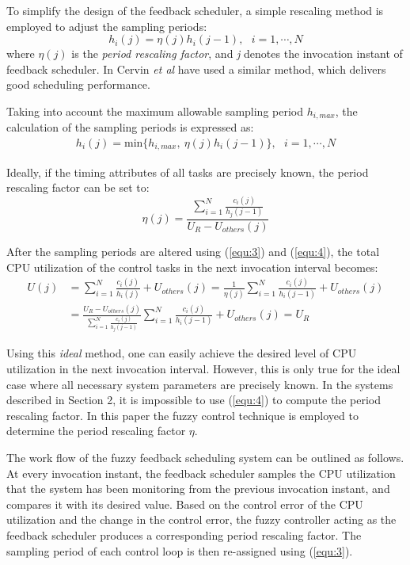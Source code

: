 \documentclass[12pt,a4paper]{ijicic}
\begin{document}
To simplify the design of the feedback scheduler, a simple
rescaling method is employed to adjust the sampling periods:
\begin{equation}
\label{equ:2}
h_i(j)=\eta(j)h_i(j-1),\ \ \ i=1,\cdots,N
\end{equation}
where $\eta(j)$  is the \emph{period rescaling factor}, and \emph{j}
denotes the invocation instant of feedback scheduler. In \cite{R6} Cervin
\emph{et al} have used a similar method, which delivers good scheduling performance.

Taking into account the maximum allowable sampling period
$h_{i,max}$, the calculation of the sampling periods is expressed as:
\begin{equation} \label{equ:3}
\begin{split}
h_i(j)=\mbox{min}\{h_{i,max},\ \eta(j)h_i(j-1)\},\ \ \ i=1,\cdots,N
\end{split}
\end{equation}

Ideally, if the timing attributes of all tasks are precisely known,
the period rescaling factor can be set to:
\begin{equation}
\label{equ:4}
\eta(j)=\frac{\sum^N_{i=1}\frac{c_i(j)}{h_j(j-1)}}{U_R-U_{others}(j)}
\end{equation}

After the sampling periods are altered using (\ref{equ:3}) and
(\ref{equ:4}), the total CPU utilization of the control tasks in the
next invocation interval becomes:
\begin{equation} \label{eq:5}
\begin{split}
U(j)&=\sum^N_{i=1}\frac{c_i(j)}{h_i(j)}+U_{others}(j)
=\frac{1}{\eta(j)}\sum^N_{i=1}\frac{c_i(j)}{h_i(j-1)}+U_{others}(j)\\
&=\frac{U_R-U_{others}(j)}{\sum^N_{i=1}\frac{c_i(j)}{h_j(j-1)}}\sum^N_{i=1}\frac{c_i(j)}{h_i(j-1)}
+U_{others}(j)=U_R
\end{split}
\end{equation}

Using this \emph{ideal} method, one can easily achieve the desired
level of CPU utilization in the next invocation interval. However,
this is only true for the ideal case where all necessary system
parameters are precisely known. In the systems described in Section
2, it is impossible to use (\ref{equ:4}) to compute the period
rescaling factor. In this paper the fuzzy control technique is
employed to determine the period rescaling factor $\eta$.

The work flow of the fuzzy feedback scheduling system can be
outlined as follows. At every invocation instant, the feedback
scheduler samples the CPU utilization that the system has been
monitoring from the previous invocation instant, and compares it
with its desired value. Based on the control error of the CPU
utilization and the change in the control error, the fuzzy controller acting as
the feedback scheduler produces a corresponding period rescaling
factor. The sampling period of each control loop is then re-assigned
using (\ref{equ:3}).
\end{document}
